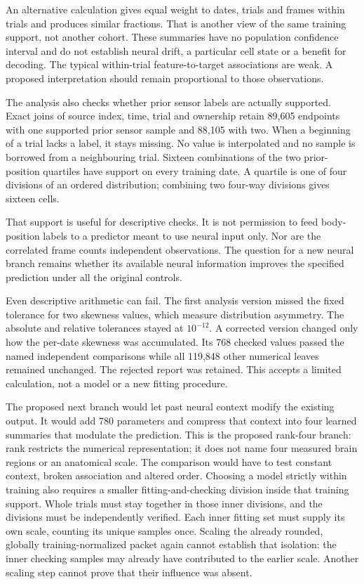An alternative calculation gives equal weight to dates, trials and frames
within trials and produces similar fractions. That is another view of the
same training support, not another cohort. These summaries have no population
confidence interval and do not establish neural drift, a particular cell state
or a benefit for decoding. The typical within-trial feature-to-target
associations are weak. A proposed interpretation should remain proportional
to those observations.

The analysis also checks whether prior sensor labels are actually supported.
Exact joins of source index, time, trial and ownership retain 89,605 endpoints
with one supported prior sensor sample and 88,105 with two. When a beginning
of a trial lacks a label, it stays missing. No value is interpolated and no
sample is borrowed from a neighbouring trial. Sixteen combinations of the two
prior-position quartiles have support on every training date. A quartile is
one of four divisions of an ordered distribution; combining two four-way
divisions gives sixteen cells.

That support is useful for descriptive checks. It is not permission to feed
body-position labels to a predictor meant to use neural input only. Nor are
the correlated frame counts independent observations. The question for a new
neural branch remains whether its available neural information improves the
specified prediction under all the original controls.

Even descriptive arithmetic can fail. The first analysis version missed the
fixed tolerance for two skewness values, which measure distribution asymmetry.
The absolute and relative tolerances stayed at $10^{-12}$. A corrected version
changed only how the per-date skewness was accumulated. Its 768 checked values
passed the named independent comparisons while all 119,848 other numerical
leaves remained unchanged. The rejected report was retained. This accepts a
limited calculation, not a model or a new fitting procedure.

The proposed next branch would let past neural context modify the existing
output. It would add 780 parameters and compress that context into four learned
summaries that modulate the prediction. This is the proposed rank-four branch:
rank restricts the numerical representation; it does not name four measured
brain regions or an anatomical scale. The comparison would have to test constant
context, broken association and altered order. Choosing a model strictly within
training also requires a smaller fitting-and-checking division inside that
training support. Whole trials must stay together in those inner divisions,
and the divisions must be independently verified. Each inner fitting set must
supply its own scale, counting its unique samples once. Scaling the already
rounded, globally training-normalized packet again cannot establish that
isolation: the inner checking samples may already have contributed to the
earlier scale. Another scaling step cannot prove that their influence was absent.

